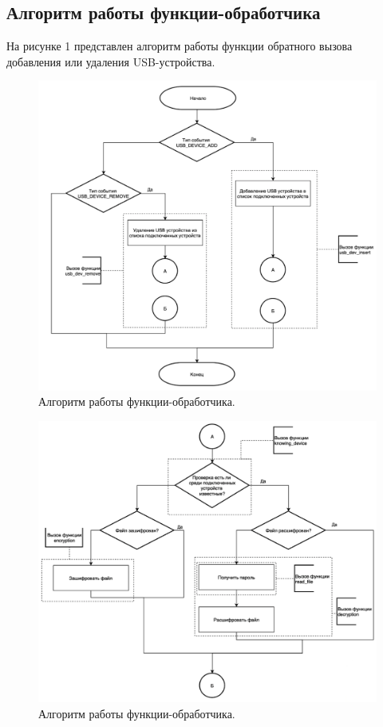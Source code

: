 \documentclass[a4paper, 10pt]{article}
\begin{document}
	\subsection{Алгоритм работы функции-обработчика}
	На рисунке 1 представлен алгоритм работы функции обратного вызова добавления или удаления USB-устройства.
	\clearpage
	\newpage
	\begin{figure}[t!]
		\centering
		\includegraphics[scale=0.49]{graph1}
		\centering\caption{Алгоритм работы функции-обработчика.}
	\end{figure}
	\clearpage
	\newpage
	\begin{figure}[t!]
		\centering
		\includegraphics[scale=0.48]{graph2}
		\centering\caption{Алгоритм работы функции-обработчика.}
	\end{figure}
\end{document}
